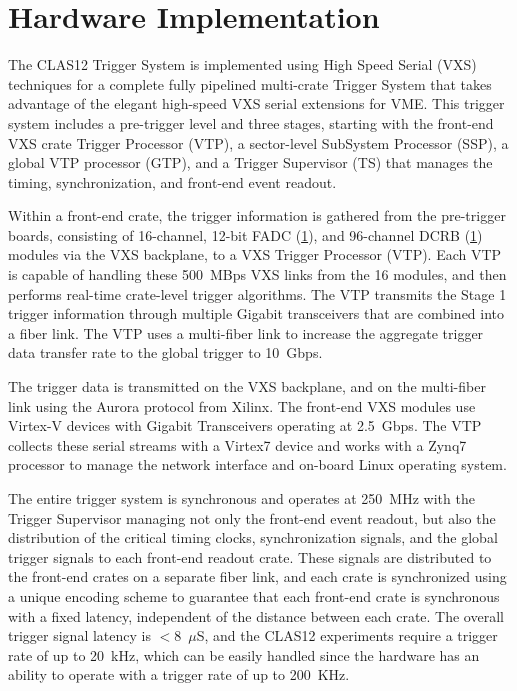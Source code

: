 \section{Hardware Implementation}

The CLAS12 Trigger System is implemented using High Speed Serial (VXS) techniques for a complete fully pipelined multi-crate Trigger System that takes advantage of the elegant high-speed VXS serial extensions for VME.  This trigger system includes a pre-trigger level and three stages, starting with the front-end VXS crate Trigger Processor (VTP), a sector-level SubSystem Processor (SSP), a global VTP processor (GTP), and a Trigger Supervisor (TS) that manages the timing, synchronization, and front-end event readout.

Within a front-end crate, the trigger information is gathered from the pre-trigger boards, consisting of 16-channel, 12-bit FADC (\ref{}), and 96-channel DCRB (\ref{}) modules via the VXS backplane, to a VXS Trigger Processor (VTP). Each VTP is capable of handling these 500~MBps VXS links from the 16 modules, and then performs real-time crate-level trigger algorithms.  The VTP transmits the Stage 1 trigger information through multiple Gigabit transceivers that are combined into a fiber link. The VTP uses a multi-fiber link to increase the aggregate trigger data transfer rate to the global trigger to 10~Gbps.

The trigger data is transmitted on the VXS backplane, and on the multi-fiber link using the Aurora protocol from Xilinx.  The front-end VXS modules use Virtex-V devices with Gigabit Transceivers operating at 2.5~Gbps. The VTP collects these serial streams with a Virtex7 device and works with a Zynq7 processor to manage the network interface and on-board Linux operating system.

The entire trigger system is synchronous and operates at 250~MHz with the Trigger Supervisor managing not only the front-end event readout, but also the distribution of the critical timing clocks, synchronization signals, and the global trigger signals to each front-end readout crate.  These signals are distributed to the front-end crates on a separate fiber link, and each crate is synchronized using a unique encoding scheme to guarantee that each front-end crate is synchronous with a fixed latency, independent of the distance between each crate.  The overall trigger signal latency is $<$8~$\mu$S, and the CLAS12 experiments require a trigger rate of up to 20~kHz, which can be easily handled since the hardware has an ability to operate with a trigger rate of up to 200~KHz.

